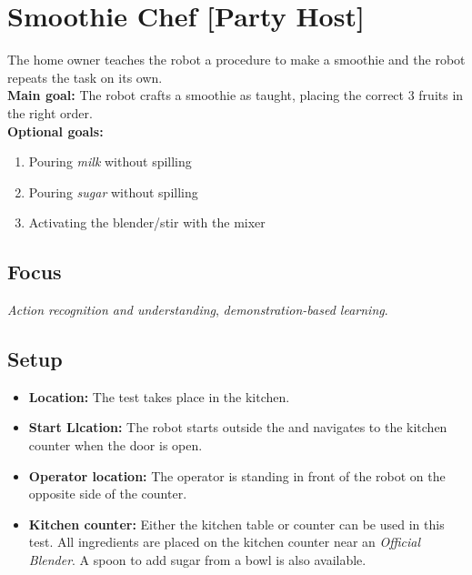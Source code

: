 \section{Smoothie Chef [Party Host]}
\label{test:smoothie-chef}
The home owner teaches the robot a procedure to make a smoothie and the robot repeats the task on its own.\\

\noindent \textbf{Main goal:} The robot crafts a smoothie as taught, placing the correct 3 fruits in the right order.\\

\noindent \textbf{Optional goals:}
\begin{enumerate}[nosep]
	\item Pouring \emph{milk} without spilling
	\item Pouring \emph{sugar} without spilling
	\item Activating the blender/stir with the mixer
\end{enumerate}


\subsection*{Focus}
\emph{Action recognition and understanding}, \emph{demonstration-based learning}.

\subsection*{Setup}
\begin{itemize}[nosep]
	\item \textbf{Location:} The test takes place in the kitchen.
	\item \textbf{Start Llcation:} The robot starts outside the \Arena{} and navigates to the kitchen counter when the door is open.
	\item \textbf{Operator location:} The operator is standing in front of the robot on the opposite side of the counter.
	\item \textbf{Kitchen counter:} Either the kitchen table or counter can be used in this test.
	All ingredients are placed on the kitchen counter near an \emph{Official Blender}.
	A spoon to add sugar from a bowl is also available.
\end{itemize}

